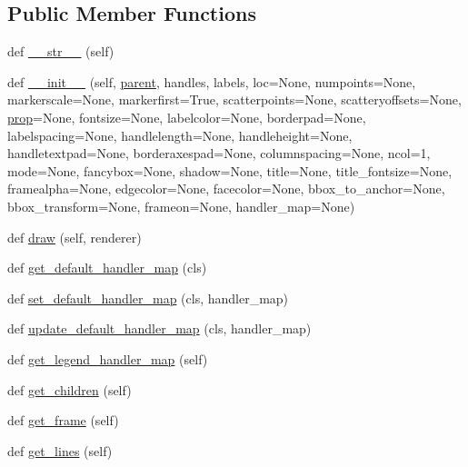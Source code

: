 \subsection*{Public Member Functions}
\begin{DoxyCompactItemize}
\item 
def \hyperlink{classmatplotlib_1_1legend_1_1Legend_aaae5d20edebb2756b86699ace4fd86ef}{\+\_\+\+\_\+str\+\_\+\+\_\+} (self)
\item 
def \hyperlink{classmatplotlib_1_1legend_1_1Legend_a0184f1e605bfeccd75604c0f232084cb}{\+\_\+\+\_\+init\+\_\+\+\_\+} (self, \hyperlink{classmatplotlib_1_1legend_1_1Legend_a744a99b8175ca5a486cdf0602d3ad20b}{parent}, handles, labels, loc=None, numpoints=None, markerscale=None, markerfirst=True, scatterpoints=None, scatteryoffsets=None, \hyperlink{classmatplotlib_1_1legend_1_1Legend_ad10de5167a28d5cccf4cdd2f965d0d19}{prop}=None, fontsize=None, labelcolor=None, borderpad=None, labelspacing=None, handlelength=None, handleheight=None, handletextpad=None, borderaxespad=None, columnspacing=None, ncol=1, mode=None, fancybox=None, shadow=None, title=None, title\+\_\+fontsize=None, framealpha=None, edgecolor=None, facecolor=None, bbox\+\_\+to\+\_\+anchor=None, bbox\+\_\+transform=None, frameon=None, handler\+\_\+map=None)
\item 
def \hyperlink{classmatplotlib_1_1legend_1_1Legend_a183b47e72d8a042b52ff47653c63ecd4}{draw} (self, renderer)
\item 
def \hyperlink{classmatplotlib_1_1legend_1_1Legend_a271fd31e4b7a106caa79559272b52d6c}{get\+\_\+default\+\_\+handler\+\_\+map} (cls)
\item 
def \hyperlink{classmatplotlib_1_1legend_1_1Legend_ac00b73cf352be20f5be2afbce92645c2}{set\+\_\+default\+\_\+handler\+\_\+map} (cls, handler\+\_\+map)
\item 
def \hyperlink{classmatplotlib_1_1legend_1_1Legend_a290bf9a76b7d56dc9f1a935d42ae68ad}{update\+\_\+default\+\_\+handler\+\_\+map} (cls, handler\+\_\+map)
\item 
def \hyperlink{classmatplotlib_1_1legend_1_1Legend_a4bd2858cc6d47ab656bf1fbf73a6bf15}{get\+\_\+legend\+\_\+handler\+\_\+map} (self)
\item 
def \hyperlink{classmatplotlib_1_1legend_1_1Legend_a3b18e2c69665de0ba7c9ea2a51ccfd20}{get\+\_\+children} (self)
\item 
def \hyperlink{classmatplotlib_1_1legend_1_1Legend_a7b3a4722b41c18aeed9a8dfa480c3cab}{get\+\_\+frame} (self)
\item 
def \hyperlink{classmatplotlib_1_1legend_1_1Legend_a876be30d37bef877f0b27780a2577c37}{get\+\_\+lines} (self)

\end{DoxyCompactItemize}
